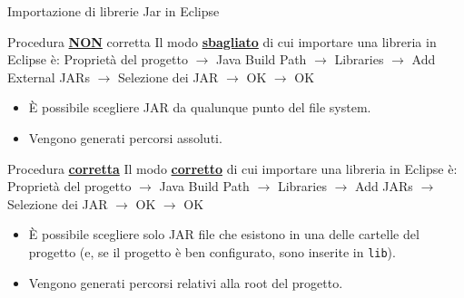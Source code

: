 \documentclass[presentation]{beamer}
\begin{document}
\begin{frame}[allowframebreaks]{Importazione di librerie Jar in Eclipse}
	\begin{block}{Procedura \textbf{\underline{NON}} corretta}
		Il modo \textbf{\underline{sbagliato}} di cui importare una libreria in Eclipse è: Proprietà del progetto $\rightarrow$ Java Build Path $\rightarrow$ Libraries $\rightarrow$ Add External JARs $\rightarrow$ Selezione dei JAR $\rightarrow$ OK $\rightarrow$ OK
		\begin{itemize}
			\item \`{E} possibile scegliere JAR da qualunque punto del file system.
			\item Vengono generati percorsi assoluti.
		\end{itemize}
	\end{block}
	\begin{block}{Procedura \textbf{\underline{corretta}}}
		Il modo \textbf{\underline{corretto}} di cui importare una libreria in Eclipse è: Proprietà del progetto $\rightarrow$ Java Build Path $\rightarrow$ Libraries $\rightarrow$ Add JARs $\rightarrow$ Selezione dei JAR $\rightarrow$ OK $\rightarrow$ OK
		\begin{itemize}
			\item \`{E} possibile scegliere solo JAR file che esistono in una delle cartelle del progetto (e, se il progetto è ben configurato, sono inserite in \texttt{lib}).
			\item Vengono generati percorsi relativi alla root del progetto.
		\end{itemize}
	\end{block}
\end{frame}
\end{document}
